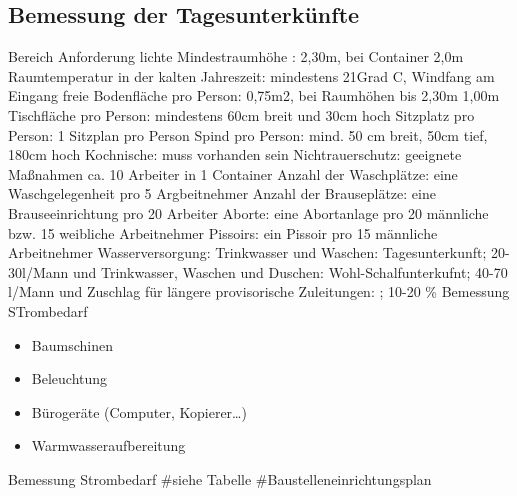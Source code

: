 \subsection{Bemessung der Tagesunterkünfte}
Bereich Anforderung
lichte Mindestraumhöhe : 2,30m, bei Container 2,0m\newline
Raumtemperatur in der kalten Jahreszeit: mindestens 21Grad C, Windfang am Eingang\newline
freie Bodenfläche pro Person: 0,75m2, bei Raumhöhen bis 2,30m 1,00m\newline
Tischfläche pro Person: mindestens 60cm breit und 30cm hoch\newline
Sitzplatz pro Person: 1 Sitzplan pro Person\newline
Spind pro Person: mind. 50 cm breit, 50cm tief, 180cm hoch \newline
Kochnische: muss vorhanden sein\newline
Nichtrauerschutz: geeignete Maßnahmen\newline
ca. 10 Arbeiter in 1 Container\newline\newline
Anzahl der Waschplätze: eine Waschgelegenheit pro 5 Argbeitnehmer\newline
Anzahl der Brauseplätze: eine Brauseeinrichtung pro 20 Arbeiter\newline
Aborte: eine Abortanlage pro 20 männliche bzw. 15 weibliche Arbeitnehmer\newline
Pissoirs: ein Pissoir pro 15 männliche Arbeitnehmer\newline\newline
Wasserversorgung:\newline
Trinkwasser und Waschen: Tagesunterkunft; 20-30l/Mann und \newline
Trinkwasser, Waschen und Duschen: Wohl-Schalfunterkufnt; 40-70 l/Mann und\newline
Zuschlag für längere provisorische Zuleitungen: ; 10-20 \%\newline \newline
Bemessung STrombedarf\newline
\begin{itemize}
\item Baumschinen
\item Beleuchtung
\item Bürogeräte (Computer, Kopierer\dots)\newline
\item Warmwasseraufbereitung
\end{itemize}
Bemessung Strombedarf\newline
#siehe Tabelle\newline\newline
#Baustelleneinrichtungsplan \newline

